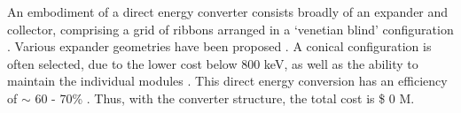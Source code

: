 \begin{table}[h]
    \centering
    \caption{Costs for the direct energy convertor subsystems.}
    \label{tab:cost-table}
\end{table}

An embodiment of a direct energy converter consists broadly of an expander and collector, comprising a grid of ribbons arranged in a `venetian blind' configuration \cite{post1970mirror}. Various expander geometries have been proposed \cite{post1970mirror}. A conical configuration is often selected, due to the lower cost below 800 keV, as well as the ability to maintain the individual modules \cite{barr1974preliminary}. This direct energy conversion has an efficiency of $\sim$ 60 - 70\% \cite{moir1973venetian}.   Thus, with the converter structure, the total cost is \$ 0 M.
